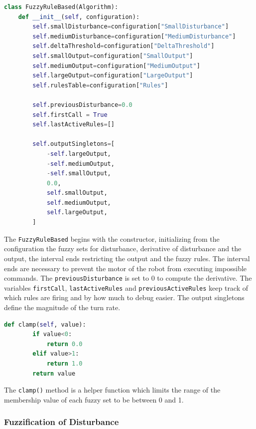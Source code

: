 \begin{lstlisting}[language=Python, caption={FuzzyRuleBasedAlgorithm constructor}, label={lst:lk-init}]
class FuzzyRuleBased(Algorithm):
    def __init__(self, configuration):
        self.smallDisturbance=configuration["SmallDisturbance"]
        self.mediumDisturbance=configuration["MediumDisturbance"]
        self.deltaThreshold=configuration["DeltaThreshold"]
        self.smallOutput=configuration["SmallOutput"]
        self.mediumOutput=configuration["MediumOutput"]
        self.largeOutput=configuration["LargeOutput"]
        self.rulesTable=configuration["Rules"]
        
        self.previousDisturbance=0.0
        self.firstCall = True
        self.lastActiveRules=[]
        
        self.outputSingletons=[
            -self.largeOutput,
            -self.mediumOutput,
            -self.smallOutput,
            0.0,
            self.smallOutput,
            self.mediumOutput,
            self.largeOutput,
        ]
\end{lstlisting}

The \texttt{FuzzyRuleBased} begins with the constructor, initializing from the configuration the fuzzy sets for disturbance, derivative of disturbance and the output, the interval ends restricting the output and the fuzzy rules. The interval ends are necessary to prevent the motor of the robot from executing impossible commands. The \texttt{previousDisturbance} is set to 0 to compute the derivative. The variables \texttt{firstCall}, \texttt{lastActiveRules} and \texttt{previousActiveRules} keep track of which rules are firing and by how much to debug easier. The output singletons define the magnitude of the turn rate.

\begin{lstlisting}[language=Python, caption={FuzzyRuleBasedAlgorithm clamp method}, label={lst:lk-init}]
def clamp(self, value):
        if value<0:
            return 0.0
        elif value>1:
            return 1.0
        return value
\end{lstlisting}

The \texttt{clamp()} method is a helper function which limits the range of the membership value of each fuzzy set to be between 0 and 1.

\subsubsection{Fuzzification of Disturbance}

